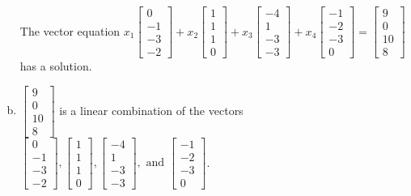 \begin{exerciseAnswer}
\begin{enumerate}[(a)]
\begin{center}
\begin{minipage}{0.8\textwidth}
 The vector equation \( x_{1} \left[\begin{array}{c}
0 \\
-1 \\
-3 \\
-2
\end{array}\right] + x_{2} \left[\begin{array}{c}
1 \\
1 \\
1 \\
0
\end{array}\right] + x_{3} \left[\begin{array}{c}
-4 \\
1 \\
-3 \\
-3
\end{array}\right] + x_{4} \left[\begin{array}{c}
-1 \\
-2 \\
-3 \\
0
\end{array}\right] = \left[\begin{array}{c}
9 \\
0 \\
10 \\
8
\end{array}\right] \)has a solution.
\end{minipage}\end{center}
    
\item 

\( \left[\begin{array}{c}
9 \\
0 \\
10 \\
8
\end{array}\right] \) is a linear combination of the vectors \( \left[\begin{array}{c}
0 \\
-1 \\
-3 \\
-2
\end{array}\right] , \left[\begin{array}{c}
1 \\
1 \\
1 \\
0
\end{array}\right] , \left[\begin{array}{c}
-4 \\
1 \\
-3 \\
-3
\end{array}\right] , \text{ and } \left[\begin{array}{c}
-1 \\
-2 \\
-3 \\
0
\end{array}\right] \). 


\end{enumerate}
    
\end{exerciseAnswer}
    
